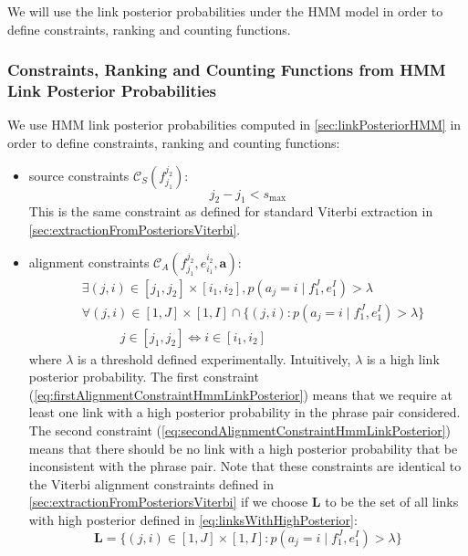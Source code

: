 We will use the link posterior probabilities under the HMM model
in order to define constraints, ranking and counting functions.

\subsubsection{Constraints, Ranking and Counting Functions from HMM Link Posterior Probabilities}

We use HMM link posterior probabilities computed in \autoref{sec:linkPosteriorHMM}
in order to define constraints, ranking and counting functions:
%
\begin{itemize}
  \item source constraints $\mathcal{C}_S(f_{j_1}^{j_2})$:
%
\begin{equation}
  j_2 - j_1  < s_{\text{max}}
\end{equation}
%
This is the same constraint as defined for standard Viterbi extraction in
\autoref{sec:extractionFromPosteriorsViterbi}.
  \item alignment constraints $\mathcal{C}_A(f_{j_1}^{j_2}, e_{i_1}^{i_2}, \bm{a})$:
%
\begin{align}
 & \exists (j,i) \in [j_1,j_2] \times [i_1,i_2], p(a_j = i \mid f_1^J,e_1^I) > \lambda \label{eq:firstAlignmentConstraintHmmLinkPosterior} \\
 & \forall (j,i) \in [1, J] \times [1, I] \cap \{(j,i): p(a_j = i \mid f_1^J,e_1^I) > \lambda\} \label{eq:secondAlignmentConstraintHmmLinkPosterior} \\
 & \hspace{3em} j \in [j_1, j_2] \Leftrightarrow i \in [i_1, i_2] \nonumber
\end{align}
%
where $\lambda$ is a threshold defined experimentally. Intuitively,
$\lambda$ is a high link posterior probability.
The first constraint (\autoref{eq:firstAlignmentConstraintHmmLinkPosterior}) means that we require at least one link with a
high posterior probability in the phrase pair considered. The second
constraint (\autoref{eq:secondAlignmentConstraintHmmLinkPosterior}) means that there should be no link with a high posterior probability
that be inconsistent with the phrase pair. Note that these constraints are
identical to the Viterbi alignment constraints defined
in \autoref{sec:extractionFromPosteriorsViterbi} if we choose $\bm{L}$ to be the
set of all links with high posterior defined in \autoref{eq:linksWithHighPosterior}:
%
\begin{equation}
  \bm{L} = \{(j, i) \in [1, J] \times [1, I]: p(a_j = i \mid f_1^J,e_1^I) > \lambda\}

\end{equation}
\end{itemize}
